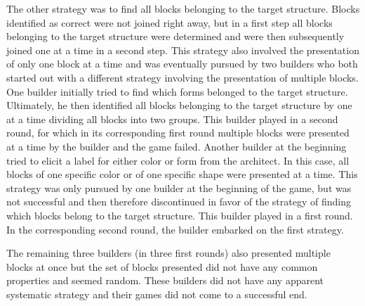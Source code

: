 The other strategy was to find all blocks belonging to the target structure. Blocks identified as correct were not joined right away, but in a first step all blocks belonging to the target structure were determined and were then subsequently joined one at a time in a second step. This strategy also involved the presentation of only one block at a time and was eventually pursued by two builders who both started out with a different strategy involving the presentation of multiple blocks. 
One builder initially tried to find which forms belonged to the target structure. Ultimately, he then identified all blocks belonging to the target structure by one at a time dividing all blocks into two groups. This builder played in a second round, for which in its corresponding first round multiple blocks were presented at a time by the builder and the game failed.
Another builder at the beginning tried to elicit a label for either color or form from the architect. In this case, all blocks of one specific color or of one specific shape were presented at a time. This strategy was only pursued by one builder at the beginning of the game, but was not successful and then therefore discontinued in favor of the strategy of finding which blocks belong to the target structure. This builder played in a first round. In the corresponding second round, the builder embarked on the first strategy.

The remaining three builders (in three first rounds) also presented multiple blocks at once but the set of blocks presented did not have any common properties and seemed random. These builders did not have any apparent systematic strategy and their games did not come to a successful end.

